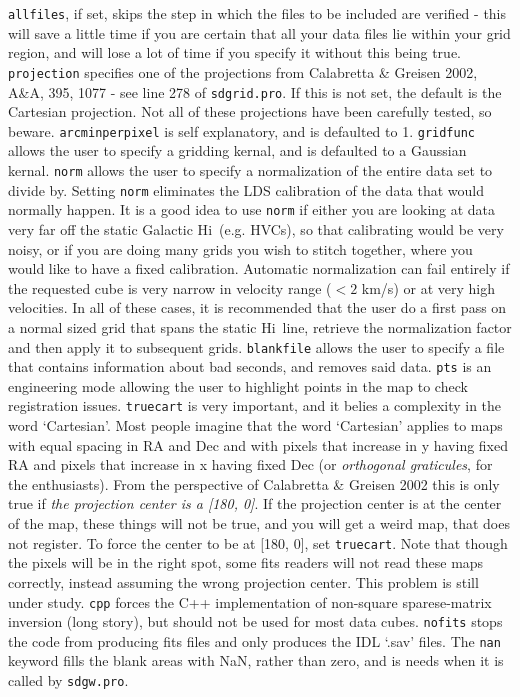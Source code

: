 \documentclass[11pt]{article}
\newcommand{\hi}{H{\sc i}~}
\begin{document}
{	\texttt{allfiles}, if set, skips the step in which the files to be included are verified - this will save a little time if you are certain that all your data files lie within your grid region, and will lose a lot of time if you specify it without this being true. \texttt{projection} specifies one of the projections from  Calabretta \& Greisen 2002, A\&A, 395, 1077 - see line 278 of \texttt{sdgrid.pro}. If this is not set, the default is the Cartesian projection. Not all of these projections have been carefully tested, so beware. \texttt{arcminperpixel} is self explanatory, and is defaulted to 1. \texttt{gridfunc} allows the user to specify a gridding kernal, and is defaulted to a Gaussian kernal. \texttt{norm} allows the user to specify a normalization of the entire data set to divide by. Setting \texttt{norm} eliminates the LDS calibration of the data that would normally happen. It is a good idea to use \texttt{norm} if either you are looking at data very far off the static Galactic \hi (e.g. HVCs), so that calibrating would be very noisy, or if you are doing many grids you wish to stitch together, where you would like to have a fixed calibration. Automatic normalization can fail entirely if the requested cube is very narrow in velocity range ($< 2$ km/s) or at very high velocities.  In all of these cases, it is recommended that the user do a first pass on a normal sized grid that spans the static \hi line, retrieve the normalization factor and then apply it to subsequent grids. \texttt{blankfile} allows the user to specify a file that contains information about bad seconds, and removes said data. \texttt{pts} is an engineering mode allowing the user to highlight points in the map to check registration issues. \texttt{truecart} is very important, and it belies a complexity in the word `Cartesian'. Most people imagine that the word `Cartesian' applies to maps with equal spacing in RA and Dec and with pixels that increase in y having fixed RA and pixels that increase in x having fixed Dec (or {\it orthogonal graticules}, for the enthusiasts). From the perspective of Calabretta \& Greisen 2002 this is only true if {\it the projection center is a [180, 0]}. If the projection center is at the center of the map, these things will not be true, and you will get a weird map, that does not register. To force the center to be at [180, 0], set \texttt{truecart}. Note that though the pixels will be in the right spot, some fits readers will not read these maps correctly, instead assuming the wrong projection center. This problem is still under study. \texttt{cpp} forces the C++ implementation of non-square sparese-matrix inversion (long story), but should not be used for most data cubes. \texttt{nofits} stops the code from producing fits files and only produces the IDL `.sav' files. The \texttt{nan} keyword fills the blank areas with NaN, rather than zero, and is needs when it is called by \texttt{sdgw.pro}.

}
\end{document}

